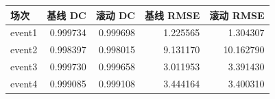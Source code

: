 \begin{tabular}{lrrrr}\toprule 场次 & 基线 DC & 滚动 DC & 基线 RMSE & 滚动 RMSE\\\midrule
event1 & 0.999734 & 0.999698 & 1.225565 & 1.304307 \\
event2 & 0.998397 & 0.998015 & 9.131170 & 10.162790 \\
event3 & 0.999730 & 0.999658 & 3.011953 & 3.391430 \\
event4 & 0.999085 & 0.999108 & 3.444164 & 3.400310 \\
\bottomrule\end{tabular}